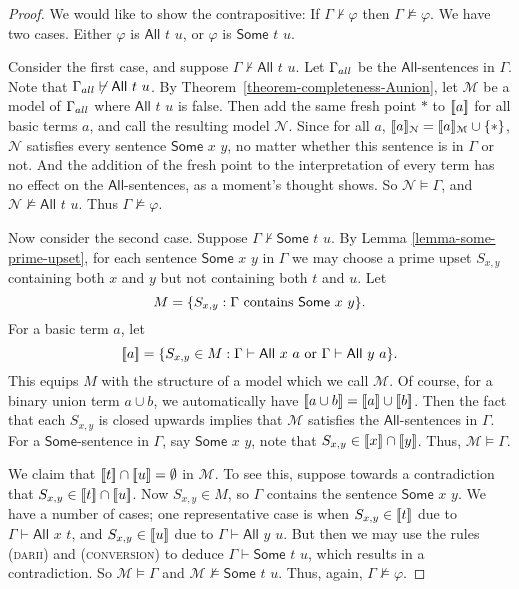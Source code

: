 \documentclass[letterpaper]{article}
\theoremstyle{definition}
\newcommand{\semantics}[1]{[\![\mbox{\em $ #1 $\/}]\!]}
\newcommand{\Model}{\mathcal{M}}
\newcommand{\Nodel}{\mathcal{N}}
\newcommand{\set}[1]{\{ #1 \}}
\newcommand{\proves}{\vdash}
\newcommand{\proverule}{\textsc}
\newcommand{\conversion}{\proverule{conversion}}
\newcommand{\darii}{\proverule{darii}}
\newcommand{\All}[2]{\mathsf{All}\,\,#1\,\,#2}
\newcommand{\Some}[2]{\mathsf{Some}\,\,#1\,\,#2}
\newcommand{\AllNoArgs}{\mathsf{All}}
\newcommand{\SomeNoArgs}{\mathsf{Some}}
\begin{document}
\begin{proof}

We would like to show the contrapositive:  
If $\Gamma \nvdash \varphi$ then $\Gamma \nvDash \varphi$. 
We have two cases.  Either $\varphi$ is $\All{t}{u}$, or $\varphi$ is $\Some{t}{u}$.

Consider the first case, and suppose $\Gamma \nvdash \All{t}{u}$.
Let $\Gamma_{\scriptsize all}$ be the $\AllNoArgs$-sentences in $\Gamma$.
Note that $\Gamma_{\scriptsize all}\not\proves \All{t}{u}$.
By Theorem~\ref{theorem-completeness-Aunion}, let $\Model$
be a model of $\Gamma_{\scriptsize all}$ where $\All{t}{u}$ is false.
Then add the same fresh point $*$ to $\semantics{a}$ for all basic terms $a$, and call the resulting model $\Nodel$.
Since for all $a$, $\semantics{a}_{\Nodel} = \semantics{a}_{\Model}\cup\set{*}$, $\Nodel$ satisfies every sentence $\Some{x}{y}$,
no matter whether this sentence is in $\Gamma$ or not.
And the addition of the fresh point to the interpretation of every term
has no effect on the $\AllNoArgs$-sentences, as a moment's thought shows.
So $\Nodel\models\Gamma$, and $\Nodel\not\models\All{t}{u}$.  Thus $\Gamma \nvDash \varphi$.

Now consider the second case.  Suppose $\Gamma \nvdash \Some{t}{u}$.  By Lemma \ref{lemma-some-prime-upset}, 
 for each sentence $\Some{x}{y}$ in $\Gamma$ we may
 choose a prime upset $S_{x,y}$ containing both $x$ and $y$
 but not containing both $t$ and $u$.
 Let 
 \[ M = \set{S_{x,y}: \Gamma \mbox{ contains }\protect{\Some{x}{y}}}.\]
 For a basic term $a$, let 
 \[\semantics{a} = \set{S_{x,y}
\in M: \Gamma \vdash \All{x}{a} \mbox{ or } \Gamma \vdash \All{y}{a}}.\]
 This equips $M$ with the structure of a model which we call $\Model$.
 Of course, for a binary union term $a \cup b$, 
 we automatically have $\semantics{a \cup b} = \semantics{a} \cup\semantics{b}$.
 Then the fact that each $S_{x,y}$ is closed upwards implies that $\Model$
satisfies the $\AllNoArgs$-sentences in $\Gamma$.
For a $\SomeNoArgs$-sentence in $\Gamma$, say $\Some{x}{y}$,
note that $S_{x,y}\in \semantics{x}\cap\semantics{y}$.  
Thus, $\Model\models\Gamma$.   

We claim that $\semantics{t}\cap\semantics{u} = \emptyset$
in $\Model$.   To see this, suppose towards a contradiction that 
$S_{x,y} \in\semantics{t}\cap\semantics{u} $.
Now $S_{x,y}\in M$, so $\Gamma$ contains
the sentence $\Some{x}{y}$.
We have a number of cases; one representative case is when
$S_{x,y} \in\semantics{t}$ due to $\Gamma \vdash \All{x}{t}$,
and $S_{x,y} \in\semantics{u}$ due to $\Gamma \vdash \All{y}{u}$.  But then we may use the rules (\darii) and (\conversion) to deduce $\Gamma \proves \Some{t}{u}$, which results in a contradiction.  So $\Model \vDash \Gamma$ and $\Model \nvDash \Some{t}{u}$.  Thus, again, $\Gamma \nvDash \varphi$.
 \end{proof}
\end{document}
